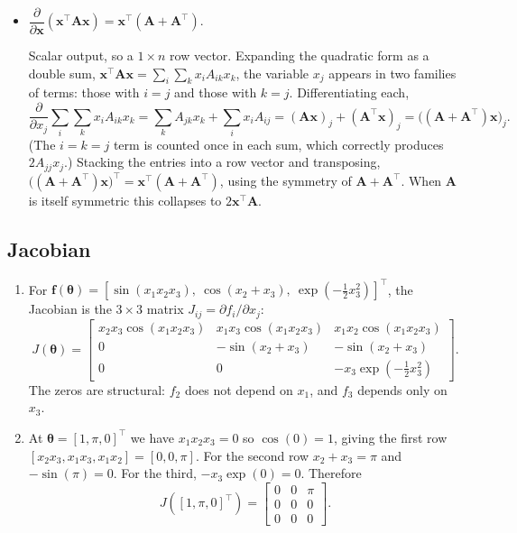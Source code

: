 \documentclass[11pt]{article}
\begin{document}
\begin{itemize}
  \item $\dfrac{\partial}{\partial \mathbf{x}}(\mathbf{x}^\top \mathbf{A}\mathbf{x})
        = \mathbf{x}^\top(\mathbf{A} + \mathbf{A}^\top)$.

        Scalar output, so a $1 \times n$ row vector. Expanding the quadratic form as a double sum,
        $\mathbf{x}^\top \mathbf{A}\mathbf{x} = \sum_{i}\sum_{k} x_i A_{ik} x_k$, the variable $x_j$ appears
        in two families of terms: those with $i = j$ and those with $k = j$. Differentiating each,
        \[
          \frac{\partial}{\partial x_j} \sum_{i}\sum_{k} x_i A_{ik} x_k
          = \sum_{k} A_{jk} x_k + \sum_{i} x_i A_{ij}
          = (\mathbf{A}\mathbf{x})_j + (\mathbf{A}^\top \mathbf{x})_j
          = \big((\mathbf{A} + \mathbf{A}^\top)\mathbf{x}\big)_j .
        \]
        (The $i = k = j$ term is counted once in each sum, which correctly produces $2A_{jj}x_j$.) Stacking
        the entries into a row vector and transposing,
        $\big((\mathbf{A}+\mathbf{A}^\top)\mathbf{x}\big)^\top
        = \mathbf{x}^\top(\mathbf{A}+\mathbf{A}^\top)$, using the symmetry of
        $\mathbf{A}+\mathbf{A}^\top$. When $\mathbf{A}$ is itself symmetric this collapses to
        $2\mathbf{x}^\top\mathbf{A}$.
\end{itemize}

\subsection{Jacobian}

\begin{enumerate}
  \item For $\mathbf{f}(\boldsymbol{\theta}) = [\sin(x_1x_2x_3),\ \cos(x_2+x_3),\
        \exp(-\tfrac{1}{2}x_3^2)]^\top$, the Jacobian is the $3 \times 3$ matrix
        $J_{ij} = \partial f_i / \partial x_j$:
        \[
          J(\boldsymbol{\theta}) =
          \begin{bmatrix}
            x_2x_3\cos(x_1x_2x_3) & x_1x_3\cos(x_1x_2x_3) & x_1x_2\cos(x_1x_2x_3) \\
            0 & -\sin(x_2+x_3) & -\sin(x_2+x_3) \\
            0 & 0 & -x_3\exp(-\tfrac{1}{2}x_3^2)
          \end{bmatrix}.
        \]
        The zeros are structural: $f_2$ does not depend on $x_1$, and $f_3$ depends only on $x_3$.

  \item At $\boldsymbol{\theta} = [1, \pi, 0]^\top$ we have $x_1x_2x_3 = 0$ so $\cos(0) = 1$, giving the
        first row $[x_2x_3, x_1x_3, x_1x_2] = [0, 0, \pi]$. For the second row $x_2 + x_3 = \pi$ and
        $-\sin(\pi) = 0$. For the third, $-x_3\exp(0) = 0$. Therefore
        \[
          J([1,\pi,0]^\top) =
          \begin{bmatrix}
            0 & 0 & \pi \\
            0 & 0 & 0 \\
            0 & 0 & 0
          \end{bmatrix}.
        \]

\end{enumerate}
\end{document}
